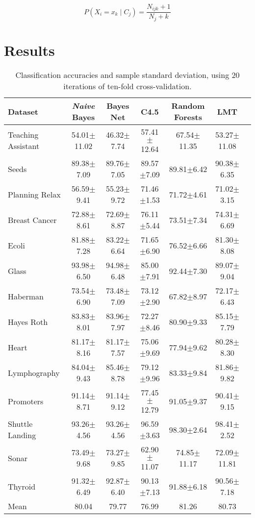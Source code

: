 \documentclass{cmppgr}
\begin{document}
$$P(X_i = x_k \mid C_j)= \frac{N_{ijk}+1}{N_j+k}$$
 

\section{Results}

\begin{table*}[t]
	\centering
	\caption{Classification accuracies and sample standard deviation, using 20 iterations of ten-fold cross-validation.}
	\begin{tabular}{|l|c|c|c|c|c|c|}
	\hline
Dataset & \textit{Naive} Bayes & Bayes Net & C4.5 &Random Forests & LMT \\\hline\hline
Teaching Assistant &  54.01$\pm$11.02 &   46.32$\pm$7.74 &  57.41$\pm$12.64 &    67.54$\pm$11.35 &  53.27$\pm$11.08  \\
Seeds & 89.38$\pm$7.09 & 89.76$\pm$7.05  &   89.57$\pm$7.09    & 89.81$\pm$6.42  &   90.38$\pm$6.35 \\
Planning Relax & 56.59$\pm$9.41 &   55.23$\pm$9.72  &   71.46$\pm$1.53 &  71.72$\pm$4.61 &   71.02$\pm$3.15\\
Breast Cancer & 72.88$\pm$8.61 &   72.69$\pm$8.87   &  76.11$\pm$5.44  &   73.51$\pm$7.34&    74.31$\pm$6.69\\
Ecoli &  81.88$\pm$7.28 &    83.22$\pm$6.64  &    71.65$\pm$6.90 &    76.52$\pm$6.66 &    81.30$\pm$8.08 \\
Glass & 93.98$\pm$6.50 &   94.98$\pm$6.48  &   85.00$\pm$7.91 &   92.44$\pm$7.30 &    89.07$\pm$9.04\\
Haberman &  73.54$\pm$6.90 &    73.48$\pm$7.09  &    73.12$\pm$2.90 &     67.82$\pm$8.97 &     72.17$\pm$6.43\\
Hayes Roth &83.83$\pm$8.01 &   83.96$\pm$7.97   &  72.27$\pm$8.46 &   80.90$\pm$9.33   &  85.15$\pm$7.79\\
Heart &  81.17$\pm$8.16  &  81.17$\pm$7.57    &  75.06$\pm$9.69    &  77.94$\pm$9.62   &   80.28$\pm$8.30\\
Lymphography & 84.04$\pm$9.43  &    85.46$\pm$8.78   &    79.12$\pm$9.96  &     83.33$\pm$9.84   &    81.86$\pm$9.82  \\
Promoters & 91.14$\pm$8.71  &  91.14$\pm$9.12   &   77.45$\pm$12.79  &   91.05$\pm$9.37    &  90.41$\pm$9.15\\
Shuttle Landing & 93.26$\pm$4.56 &   93.26$\pm$4.56   &   96.59$\pm$3.63   &   98.30$\pm$2.64 &    98.41$\pm$2.52 \\
Sonar & 73.49$\pm$9.68 &   73.27$\pm$9.85  &    62.90$\pm$11.07  &   74.85$\pm$11.17   &   72.09$\pm$11.81  \\
Thyroid & 91.32$\pm$6.49 &  92.87$\pm$6.40   &   90.13$\pm$7.13    &  91.88$\pm$6.18   &   90.56$\pm$7.18 \\\hline
Mean &   80.04 &  79.77    &   76.99    &   81.26    &     80.73  \\\hline
	\end{tabular}
	\label{tab:example}
\end{table*}
\end{document}
